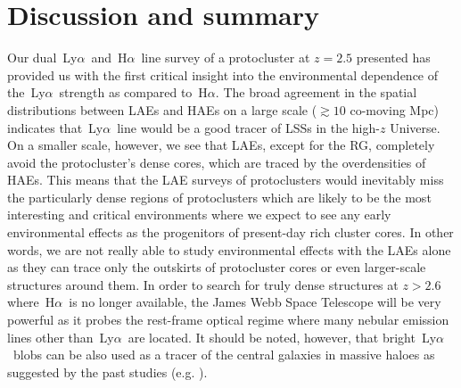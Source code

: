 \documentclass[letters,usenatbib]{mnras}
\def\lya{{\rm\,Ly$\alpha$}}
\def\ha{{\rm\,H$\alpha$}}
\begin{document}
\section{Discussion and summary}

Our dual \lya\ and \ha\ line survey of a protocluster at $z=2.5$ presented has 
provided us with the first critical insight into the environmental dependence of 
the \lya\ strength as compared to \ha. The broad agreement in the spatial 
distributions between LAEs and HAEs on a large scale ($\gtrsim10$ co-moving Mpc) 
indicates that \lya\ line would be a good tracer of LSSs in the high-$z$ Universe. 
On a smaller scale, however, we see that LAEs, except for the RG, completely avoid 
the protocluster's dense cores, which are traced by the overdensities of HAEs. 
This means that the LAE surveys of protoclusters would inevitably miss the 
particularly dense regions of protoclusters which are likely to be the most 
interesting and critical environments where we expect to see any early 
environmental effects as the progenitors of present-day rich cluster cores. In 
other words, we are not really able to study environmental effects with the LAEs 
alone as they can trace only the outskirts of protocluster cores or even 
larger-scale structures around them. In order to search for truly dense structures 
at $z>2.6$ where \ha\ is no longer available, the James Webb Space Telescope 
\citep{Gardner:2006} will be very powerful as it probes the rest-frame optical 
regime where many nebular emission lines other than \lya\ are located. It should 
be noted, however, that bright \lya\ blobs can be also used as a tracer of the 
central galaxies in massive haloes as suggested by the past studies (e.g. 
\citealt{Steidel:2000,Matsuda:2011}). 
\end{document}
